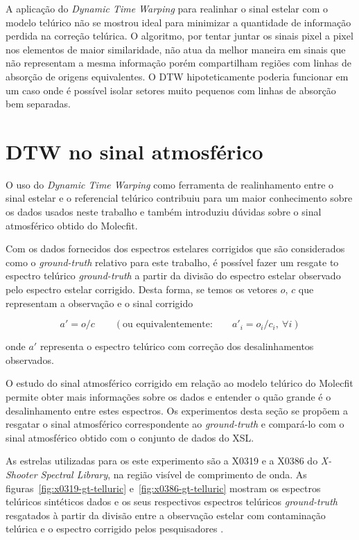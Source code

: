 A aplicação do \textit{Dynamic Time Warping} para realinhar o sinal estelar com o modelo telúrico não se mostrou ideal para minimizar a quantidade de informação perdida na correção telúrica. O algoritmo, por tentar juntar os sinais pixel a pixel nos elementos de maior similaridade, não atua da melhor maneira em sinais que não representam a mesma informação porém compartilham regiões com linhas de absorção de origens equivalentes. O DTW hipoteticamente poderia funcionar em um caso onde é possível isolar setores muito pequenos com linhas de absorção bem separadas.


\section{DTW no sinal atmosférico}

O uso do \textit{Dynamic Time Warping} como ferramenta de realinhamento entre o sinal estelar e o referencial telúrico contribuiu para um maior conhecimento sobre os dados usados neste trabalho e também introduziu dúvidas sobre o sinal atmosférico obtido do Molecfit.

Com os dados fornecidos dos espectros estelares corrigidos que são considerados como o \textit{ground-truth} relativo para este trabalho, é possível fazer um resgate to espectro telúrico \textit{ground-truth} a partir da divisão do espectro estelar observado pelo espectro estelar corrigido. Desta forma, se temos os vetores $o$, $c$ que representam a observação e o sinal corrigido

\begin{equation*}
    a' = o / c \qquad \left(\mbox{ou equivalentemente:} \qquad a'_{i} = o_i / c_i,\ \forall i\right)
\end{equation*}

\noindent onde $a'$ representa o espectro telúrico com correção dos desalinhamentos observados.

O estudo do sinal atmosférico corrigido em relação ao modelo telúrico do Molecfit permite obter mais informações sobre os dados e entender o quão grande é o desalinhamento entre estes espectros. Os experimentos desta seção se propõem a resgatar o sinal atmosférico correspondente ao \textit{ground-truth} e compará-lo com o sinal atmosférico obtido com o conjunto de dados do XSL.

As estrelas utilizadas para os este experimento são a X0319 e a X0386 do \textit{X-Shooter Spectral Library}, na região visível de comprimento de onda. As figuras~\ref{fig:x0319-gt-telluric} e~\ref{fig:x0386-gt-telluric} mostram os espectros telúricos sintéticos dados e os seus respectivos espectros telúricos \textit{ground-truth} resgatados à partir da divisão entre a observação estelar com contaminação telúrica e o espectro corrigido pelos pesquisadores \citep{unpublished-xshooter-data-release}.

